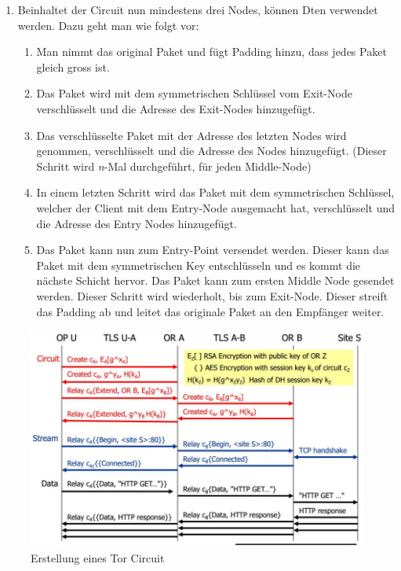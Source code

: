 \begin{enumerate}
	\item Beinhaltet der Circuit nun mindestens drei Nodes, können Dten verwendet werden. Dazu geht man wie folgt vor:
	\begin{enumerate}
	    \item Man nimmt das original Paket und fügt Padding hinzu, dass jedes Paket gleich gross ist.
	    \item Das Paket wird mit dem symmetrischen Schlüssel vom Exit-Node verschlüsselt und die Adresse des Exit-Nodes hinzugefügt.
	    \item Das verschlüsselte Paket mit der Adresse des letzten Nodes wird genommen, verschlüsselt und die Adresse des Nodes hinzugefügt. (Dieser Schritt wird \textit{n}-Mal durchgeführt, für jeden Middle-Node)
	    \item In einem letzten Schritt wird das Paket mit dem symmetrischen Schlüssel, welcher der Client mit dem Entry-Node ausgemacht hat, verschlüsselt und die Adresse des Entry Nodes hinzugefügt. 
	    \item Das Paket kann nun zum Entry-Point versendet werden. Dieser kann das Paket mit dem symmetrischen Key entschlüsseln und es kommt die nächste Schicht hervor. Das Paket kann zum ersten Middle Node gesendet werden. Dieser Schritt wird wiederholt, bis zum Exit-Node. Dieser streift das Padding ab und leitet das originale Paket an den Empfänger weiter.
	\end{enumerate}
\end{enumerate}

\begin{figure}[h]
\centering
\includegraphics[width=0.7\linewidth]{images/tor_circuit_construction}
\caption{Erstellung eines Tor Circuit}
\label{fig:torcircuitconstruction}
\end{figure}


